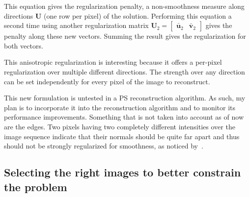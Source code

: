 This equation gives the regularization penalty, a non-smoothness measure along directions $\mathbf{U}$ (one row per pixel) of the solution. Performing this equation a second time using another regularization matrix $\mathbf{U}_2 = \begin{bmatrix}\bar{\mathbf{u}}_2 & \bar{\mathbf{v}}_2 \end{bmatrix}$ gives the penalty along these new vectors. Summing the result gives the regularization for both vectors.

This anisotropic regularization is interesting because it offers a per-pixel regularization over multiple different directions. The strength over any direction can be set independently for every pixel of the image to reconstruct.

This new formulation is untested in a PS reconstruction algorithm. As such, my plan is to incorporate it into the reconstruction algorithm and to monitor its performance improvements. Something that is not taken into account as of now are the edges. Two pixels having two completely different intensities over the image sequence indicate that their normals should be quite far apart and thus should not be strongly regularized for smoothness, as noticed by~\cite{jung-cvpr-15}.


\subsection{Selecting the right images to better constrain the problem}
\label{subsec:selection}


